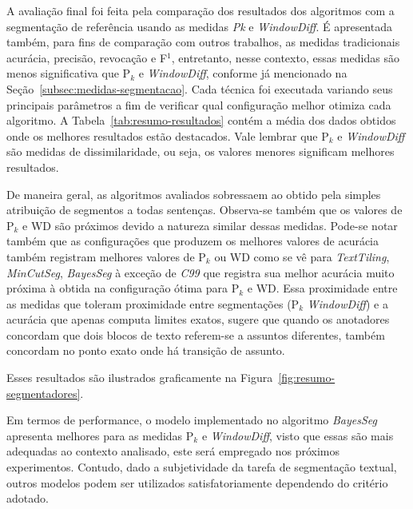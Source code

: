 A avaliação final foi feita pela comparação dos resultados dos algoritmos com a segmentação de referência usando as medidas \textit{Pk} e \textit{WindowDiff}. É apresentada também, para fins de comparação com outros trabalhos, as medidas tradicionais acurácia, precisão, revocação e F$^1$, entretanto, nesse contexto, essas medidas são menos significativa que P$_k$ e \textit{WindowDiff}, conforme já mencionado na Seção~\ref{subsec:medidas-segmentacao}. 
Cada técnica foi executada variando seus principais parâmetros a fim de verificar qual configuração melhor otimiza cada algoritmo. A Tabela~\ref{tab:resumo-resultados} contém a média dos dados obtidos onde os melhores resultados estão destacados. Vale lembrar que P$_k$ e \textit{WindowDiff} são medidas de dissimilaridade, ou seja, os valores menores significam melhores resultados.





De maneira geral, as algoritmos avaliados sobressaem ao obtido pela simples atribuição de segmentos a todas sentenças. Observa-se também que os valores de P$_k$ e WD são próximos devido a natureza similar dessas medidas. Pode-se notar também que as configurações que produzem os melhores valores de acurácia também registram melhores valores de P$_k$ ou WD como se vê para \textit{TextTiling}, \textit{MinCutSeg}, \textit{BayesSeg} à exceção de \textit{C99} que registra sua melhor acurácia muito próxima à obtida na configuração ótima para P$_k$ e WD. 
Essa proximidade entre as medidas que toleram proximidade entre segmentações (P$_k$ \textit{WindowDiff}) e a acurácia que apenas computa limites exatos, sugere que quando os anotadores concordam que dois blocos de texto referem-se a assuntos diferentes, também concordam no ponto exato onde há transição de assunto.

Esses resultados são ilustrados graficamente na Figura~\ref{fig:resumo-segmentadores}.

Em termos de performance, o modelo implementado no algoritmo \textit{BayesSeg} apresenta melhores para as medidas P$_k$ e \textit{WindowDiff}, visto que essas são mais adequadas ao contexto analisado, este será empregado nos próximos experimentos. Contudo, dado a subjetividade da tarefa de segmentação textual, outros modelos podem ser utilizados satisfatoriamente dependendo do critério adotado. 


